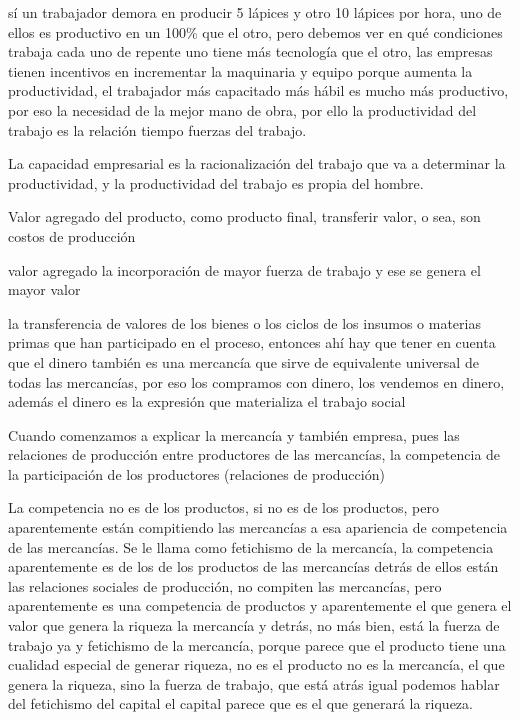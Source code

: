 \documentclass[
  a4paper,
]{article}
\begin{document}
sí un trabajador demora en producir 5 lápices y otro 10 lápices por
hora, uno de ellos es productivo en un 100\% que el otro, pero debemos
ver en qué condiciones trabaja cada uno de repente uno tiene más
tecnología que el otro, las empresas tienen incentivos en incrementar la
maquinaria y equipo porque aumenta la productividad, el trabajador más
capacitado más hábil es mucho más productivo, por eso la necesidad de la
mejor mano de obra, por ello la productividad del trabajo es la relación
tiempo fuerzas del trabajo.

La capacidad empresarial es la racionalización del trabajo que va a
determinar la productividad, y la productividad del trabajo es propia
del hombre.

Valor agregado del producto, como producto final, transferir valor, o
sea, son costos de producción

valor agregado la incorporación de mayor fuerza de trabajo y ese se
genera el mayor valor

la transferencia de valores de los bienes o los ciclos de los insumos o
materias primas que han participado en el proceso, entonces ahí hay que
tener en cuenta que el dinero también es una mercancía que sirve de
equivalente universal de todas las mercancías, por eso los compramos con
dinero, los vendemos en dinero, además el dinero es la expresión que
materializa el trabajo social

Cuando comenzamos a explicar la mercancía y también empresa, pues las
relaciones de producción entre productores de las mercancías, la
competencia de la participación de los productores (relaciones de
producción)

La competencia no es de los productos, si no es de los productos, pero
aparentemente están compitiendo las mercancías a esa apariencia de
competencia de las mercancías. Se le llama como fetichismo de la
mercancía, la competencia aparentemente es de los de los productos de
las mercancías detrás de ellos están las relaciones sociales de
producción, no compiten las mercancías, pero aparentemente es una
competencia de productos y aparentemente el que genera el valor que
genera la riqueza la mercancía y detrás, no más bien, está la fuerza de
trabajo ya y fetichismo de la mercancía, porque parece que el producto
tiene una cualidad especial de generar riqueza, no es el producto no es
la mercancía, el que genera la riqueza, sino la fuerza de trabajo, que
está atrás igual podemos hablar del fetichismo del capital el capital
parece que es el que generará la riqueza.
\end{document}
